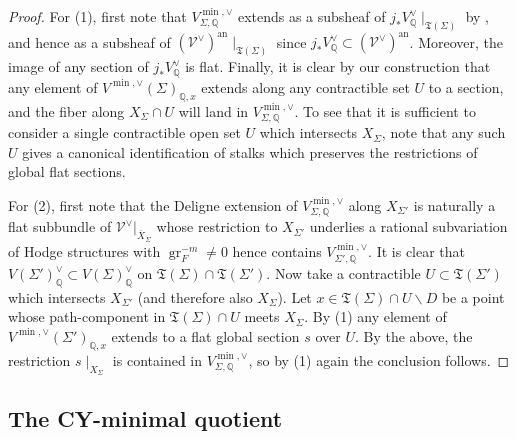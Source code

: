 \documentclass{amsart}
\newcommand{\bs}{\backslash}
\newcommand{\an}{\operatorname{an}}
\newcommand{\ol}{\overline}
\theoremstyle{definition}
\theoremstyle{remark}
\def\bQ{\mathbb{Q}}
\def\cV{\mathcal{V}}
\def\fT{\mathfrak{T}}
\def\an{\mathrm{an}}
\def\gr{\operatorname{gr}}
\def\fT{\mathfrak{T}}
\renewcommand{\bar}[1]{\ol{#1}}
\numberwithin{equation}{section}
\begin{document}
\begin{proof}

For (1), first note that $V^{\min,\vee}_{\Sigma,\bQ}$ extends as a subsheaf of $j_*V^\vee_\bQ\mid_{\fT(\Sigma)}$ by , and hence as a subsheaf of $(\cV^\vee)^{\an}\mid_{\fT(\Sigma)}$ since $j_*V^\vee_\bQ\subset (\cV^\vee)^{\an}$. Moreover, the image of any section of $j_*V^\vee_\bQ$ is flat. Finally, it is clear by our construction that any element of $V^{\min,\vee}(\Sigma)_{\bQ,x}$ extends along any contractible set $U$ to a section, and the fiber along $X_{\Sigma}\cap U$ will land in $V_{\Sigma,\bQ}^{\min,\vee}$. To see that it is sufficient to consider a single contractible open set $U$ which intersects $X_{\Sigma}$, note that any such $U$ gives a canonical identification of stalks which preserves the restrictions of global flat sections. 


For (2), first note that the Deligne extension of $V^{\min,\vee}_{\Sigma,\bQ}$ along $X_{\Sigma'}$ is naturally a flat subbundle of $\cV^{\vee}|_{\bar{ X}_\Sigma}$ whose restriction to $X_{\Sigma'}$ underlies a rational subvariation of Hodge structures with $\gr_F^{-m}\neq 0$  hence contains $V^{\min,\vee}_{\Sigma',\bQ}$. It is clear that $V(\Sigma')^\vee_\bQ\subset V(\Sigma)^\vee_\bQ$ on $\mathfrak{T}(\Sigma)\cap \mathfrak{T}(\Sigma')$. Now take a contractible $U \subset \fT(\Sigma')$ which intersects $X_{\Sigma'}$ (and therefore also $X_{\Sigma}$).  Let $x\in \fT(\Sigma)\cap U\bs D$ be a point whose path-component in $\fT(\Sigma)\cap U$ meets $X_{\Sigma}$.  By (1) any element of $V^{\min,\vee}(\Sigma')_{\bQ,x}$ extends to a flat global section $s$ over $U$. By the above, the restriction $s\mid_{X_{\Sigma}}$ is contained in $V^{\min,\vee}_{\Sigma,\bQ}$, so by (1) again the conclusion follows.
\end{proof}




\subsection{The CY-minimal quotient}\label{subsect:map to Pn}
\end{document}
